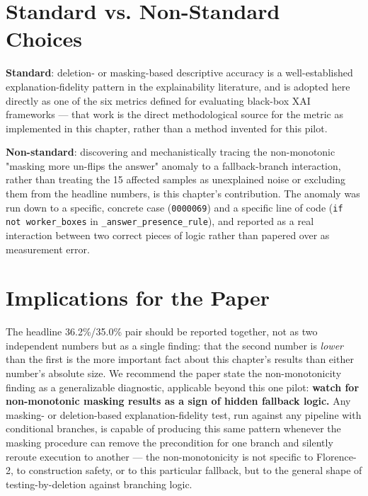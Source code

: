 \section{Standard vs. Non-Standard Choices}

\textbf{Standard}: deletion- or masking-based descriptive accuracy is a well-established
explanation-fidelity pattern in the explainability literature, and is adopted here directly as one of
the six metrics defined for evaluating black-box XAI frameworks \citep{arreche2024exai} --- that
work is the direct methodological source for the metric as implemented in this chapter, rather than a
method invented for this pilot.

\textbf{Non-standard}: discovering and mechanistically tracing the non-monotonic "masking more
un-flips the answer" anomaly to a fallback-branch interaction, rather than treating the 15 affected
samples as unexplained noise or excluding them from the headline numbers, is this chapter's
contribution. The anomaly was run down to a specific, concrete case (\texttt{0000069}) and a specific
line of code (\texttt{if not worker\_boxes} in \texttt{\_answer\_presence\_rule}), and reported as a
real interaction between two correct pieces of logic rather than papered over as measurement error.

\section{Implications for the Paper}

The headline 36.2\%/35.0\% pair should be reported together, not as two independent numbers but as a
single finding: that the second number is \emph{lower} than the first is the more important fact about
this chapter's results than either number's absolute size. We recommend the paper state the
non-monotonicity finding as a generalizable diagnostic, applicable beyond this one pilot: \textbf{watch
for non-monotonic masking results as a sign of hidden fallback logic.} Any masking- or
deletion-based explanation-fidelity test, run against any pipeline with conditional branches, is
capable of producing this same pattern whenever the masking procedure can remove the precondition for
one branch and silently reroute execution to another --- the non-monotonicity is not specific to
Florence-2, to construction safety, or to this particular fallback, but to the general shape of
testing-by-deletion against branching logic.

